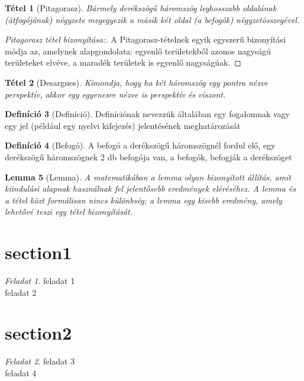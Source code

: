 \documentclass{article}
\theoremstyle{plain}
\newtheorem{tet}{Tétel}
\newtheorem{lem}[tet]{Lemma}
\theoremstyle{definition}
\newtheorem{defin}[tet]{Definíció}
\theoremstyle{remark}
\newtheorem{fel}{Feladat}[section]
\begin{document}
\lstlistoflistings
\listofalgorithms
{}




\begin{tet}[Pitagorasz]
Bármely derékszögű háromszög leghosszabb oldalának (átfogójának) négyzete megegyezik a másik két oldal (a befogók) négyzetösszegével.
\end{tet}

\begin{proof}[Pitagorasz tétel bizonyítása:]
A Pitagorasz-tételnek egyik egyszerű bizonyítási módja az, amelynek alapgondolata: egyenlő területekből azonos nagyságú területeket elvéve, a maradék területek is egyenlő nagyságúak.
\end{proof}

\begin{tet}[Desargues]
Kimondja, hogy ha két háromszög egy pontra nézve perspektív, akkor egy egyenesre nézve is perspektív és viszont.
\end{tet}

\begin{defin}[Definíció]
Definíciónak nevezzük általában egy fogalomnak vagy egy jel (például egy nyelvi kifejezés) jelentésének meghatározását
\end{defin}

\begin{defin}[Befogó]
A befogó a derékszögű háromszögnél fordul elő,
egy derékszögű háromszögnek 2 db befogója van,
a befogók, befogják a derékszöget
\end{defin}

\begin{lem}[Lemma]
A matematikában a lemma olyan bizonyított állítás, amit kiindulási alapnak használnak fel jelentősebb eredmények eléréséhez. A lemma és a tétel közt formálisan nincs különbség; a lemma egy kisebb eredmény, amely lehetővé teszi egy tétel bizonyítását.
\end{lem}

\section{section1}
\begin{fel}

feladat 1 \\
feladat 2

 \end{fel}
 
 \section{section2}
 \begin{fel}

feladat 3 \\
feladat 4

 \end{fel}
 
\end{document}
